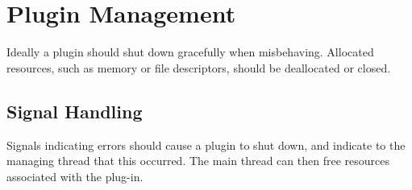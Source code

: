 \chapter {Plugin Management}

Ideally a plugin should shut down gracefully when misbehaving. Allocated
resources, such as memory or file descriptors, should be deallocated or closed.

\section {Signal Handling}

Signals indicating errors should cause a plugin to shut down, and indicate to
the managing thread that this occurred. The main thread can then free resources
associated with the plug-in.
